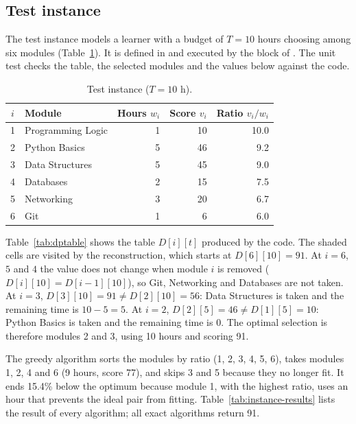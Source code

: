 \FloatBarrier
\subsection{Test instance}\label{sec:testinstance}

The test instance models a learner with a budget of $T=10$ hours choosing among six modules (Table~\ref{tab:instance}). It is defined in  and executed by the block  of . The unit test  checks the table, the selected modules and the values below against the code.

\begin{table}[h]
\centering
\caption{Test instance ($T=10$ h).}\label{tab:instance}
\small
\begin{tabular}{@{}c l r r r@{}}
\toprule
$i$ & Module & Hours $w_i$ & Score $v_i$ & Ratio $v_i/w_i$\\
\midrule
1 & Programming Logic & 1 & 10 & 10.0\\
2 & Python Basics & 5 & 46 & 9.2\\
3 & Data Structures & 5 & 45 & 9.0\\
4 & Databases & 2 & 15 & 7.5\\
5 & Networking & 3 & 20 & 6.7\\
6 & Git & 1 & 6 & 6.0\\
\bottomrule
\end{tabular}
\end{table}

Table~\ref{tab:dptable} shows the table $D[i][t]$ produced by the code. The shaded cells are visited by the reconstruction, which starts at $D[6][10]=91$. At $i=6$, $5$ and $4$ the value does not change when module $i$ is removed ($D[i][10]=D[i-1][10]$), so Git, Networking and Databases are not taken. At $i=3$, $D[3][10]=91\neq D[2][10]=56$: Data Structures is taken and the remaining time is $10-5=5$. At $i=2$, $D[2][5]=46\neq D[1][5]=10$: Python Basics is taken and the remaining time is $0$. The optimal selection is therefore modules 2 and 3, using 10 hours and scoring 91.

\begin{table}[h]
\centering
\caption{Dynamic-programming table for the test instance. Rows: modules considered; columns: available time $t$. Shaded: cells visited by the reconstruction; bold: modules taken.}\label{tab:dptable}
\small

\end{table}

The greedy algorithm sorts the modules by ratio (1, 2, 3, 4, 5, 6), takes modules 1, 2, 4 and 6 (9 hours, score 77), and skips 3 and 5 because they no longer fit. It ends 15.4\% below the optimum because module 1, with the highest ratio, uses an hour that prevents the ideal pair from fitting. Table~\ref{tab:instance-results} lists the result of every algorithm; all exact algorithms return 91.

